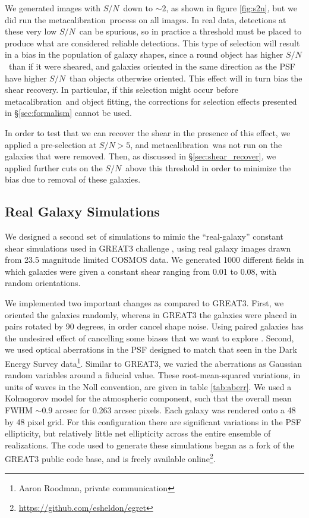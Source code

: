 \documentclass[iop]{emulateapj}
\newcommand{\snr}{$S/N$}
\newcommand{\mcal}{metacalibration}
\begin{document}
We generated images with \snr\ down to $\sim 2$, as shown in figure
\ref{fig:s2n}, but we did run the \mcal\ process on all images.  In real data,
detections at these very low \snr\ can be spurious, so in practice a threshold
must be placed to produce what are considered reliable detections.  This type
of selection will result in a bias in the population of galaxy shapes, since a
round object has higher \snr\ than if it were sheared, and galaxies oriented in
the same direction as the PSF have higher \snr\ than objects otherwise
oriented.  This effect will in turn bias the shear recovery.  In particular, if
this selection might occur before \mcal\ and object fitting, the corrections
for selection effects presented in \S \ref{sec:formalism} cannot be used.

In order to test that we can recover the shear in the presence of this effect,
we applied a pre-selection at \snr$ > 5$, and \mcal\ was not run on the
galaxies that were removed.  Then, as discussed in \S \ref{sec:shear_recover},
we applied further cuts on the \snr\ above this threshold in order to minimize
the bias due to removal of these galaxies.


\subsection{Real Galaxy Simulations} \label{sec:cosmosim}

We designed a second set of simulations to mimic the ``real-galaxy'' constant
shear simulations used in GREAT3 challenge \citep{great3}, using real galaxy
images drawn from 23.5 magnitude limited COSMOS data.  We generated 1000
different fields in which galaxies were given a constant shear ranging from
0.01 to 0.08, with random orientations.

We implemented two important changes as compared to GREAT3.  First, we oriented
the galaxies randomly, whereas in GREAT3 the galaxies were placed in pairs
rotated by 90 degrees, in order cancel shape noise.  Using paired galaxies has
the undesired effect of cancelling some biases that we want to explore
\citep{DESSVShear}.  Second, we used optical aberrations in the PSF designed to
match that seen in the Dark Energy Survey data\footnote{Aaron Roodman, private
communication}.  Similar to GREAT3, we varied the aberrations as Gaussian
random variables around a fiducial value. These root-mean-squared variations,
in units of waves in the Noll convention, are given in table \ref{tab:aberr}.
We used a Kolmogorov model for the atmospheric component, such that
the overall mean FWHM $\sim 0.9$ arcsec for 0.263 arcsec pixels.
Each galaxy was rendered onto a 48 by 48 pixel grid.
For this configuration there are
significant variations in the PSF ellipticity, but relatively little net
ellipticity across the entire ensemble of realizations.  The code used to
generate these simulations began as a fork of the GREAT3 public code base, and
is freely available online\footnote{\url{https://github.com/esheldon/egret}}.
\end{document}
